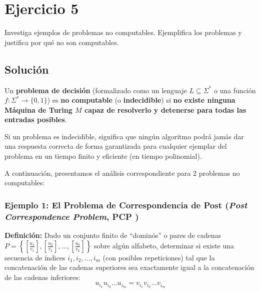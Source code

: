\section{Ejercicio 5}


\begin{tcolorbox}[enunciado]
Investiga ejemplos de problemas no computables. Ejemplifica los problemas y justifica por qué no son computables.
\end{tcolorbox}

\subsection{Solución}

Un \textbf{problema de decisión} (formalizado como un lenguaje $L \subseteq \Sigma^*$ o una función $f : \Sigma^* \to \{0, 1\}$) es \textbf{no computable} (o \textbf{indecidible}) si \textbf{no existe ninguna Máquina de Turing $M$ capaz de resolverlo y detenerse para todas las entradas posibles}. 

Si un problema es indecidible, significa que ningún algoritmo podrá jamás dar una respuesta correcta de forma garantizada para cualquier ejemplar del problema en un tiempo finito y eficiente (en tiempo polinomial).

A continuación, presentamos el análisis correspondiente para 2 problemas no computables:

\subsubsection*{Ejemplo 1: El Problema de Correspondencia de Post (\textit{Post Correspondence Problem}, PCP \cite{wiki_pcp_2026}) \cite{carrion_teoria}}

\textbf{Definición:} Dado un conjunto finito de ``dominós'' o pares de cadenas $P = \left\{ \left[\frac{u_1}{v_1}\right], \left[\frac{u_2}{v_2}\right], \dots, \left[\frac{u_k}{v_k}\right] \right\}$ sobre algún alfabeto, determinar si existe una secuencia de índices $i_1, i_2, \dots, i_m$ (con posibles repeticiones) tal que la concatenación de las cadenas superiores sea exactamente igual a la concatenación de las cadenas inferiores:
\[
    u_{i_1} u_{i_2} \dots u_{i_m} = v_{i_1} v_{i_2} \dots v_{i_m}
\]

